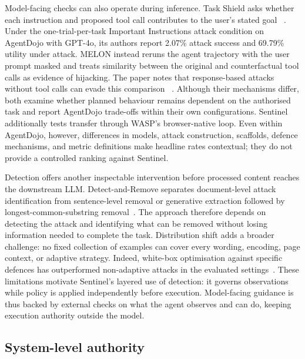 Model-facing checks can also operate during inference. Task Shield asks whether
each instruction and proposed tool call contributes to the user's stated goal
~\cite{jia2025taskshield}. Under the one-trial-per-task Important
Instructions attack condition on AgentDojo with GPT-4o, its authors report
2.07\% attack success and 69.79\% utility under attack. MELON instead reruns
the agent trajectory with the user prompt masked and treats similarity between
the original and counterfactual tool calls as evidence of hijacking. The paper
notes that response-based attacks without tool calls can evade this comparison
~\cite{zhu2025melon}. Although their mechanisms differ, both examine whether
planned behaviour remains dependent on the authorised task and report
AgentDojo trade-offs within their own configurations. Sentinel additionally
tests transfer through WASP's browser-native loop. Even within AgentDojo,
however, differences in models, attack construction, scaffolds, defence
mechanisms, and metric definitions make headline rates contextual; they do not
provide a controlled ranking against Sentinel.

Detection offers another inspectable intervention before processed content
reaches the downstream LLM. Detect-and-Remove separates document-level attack
identification from sentence-level removal or generative extraction followed
by longest-common-substring removal~\cite{chen2025detectremove}. The approach
therefore depends on detecting the attack and identifying what can be removed
without losing information needed to complete the task. Distribution shift
adds a broader challenge: no fixed collection of examples can cover every
wording, encoding, page context, or adaptive strategy. Indeed, white-box
optimisation against specific defences has outperformed non-adaptive attacks in
the evaluated settings~\cite{zhan2025adaptive}. These limitations motivate
Sentinel's layered use of detection: it governs observations while policy is
applied independently before execution. Model-facing guidance is thus backed
by external checks on what the agent observes and can do, keeping execution
authority outside the model.

\subsection{System-level authority}

